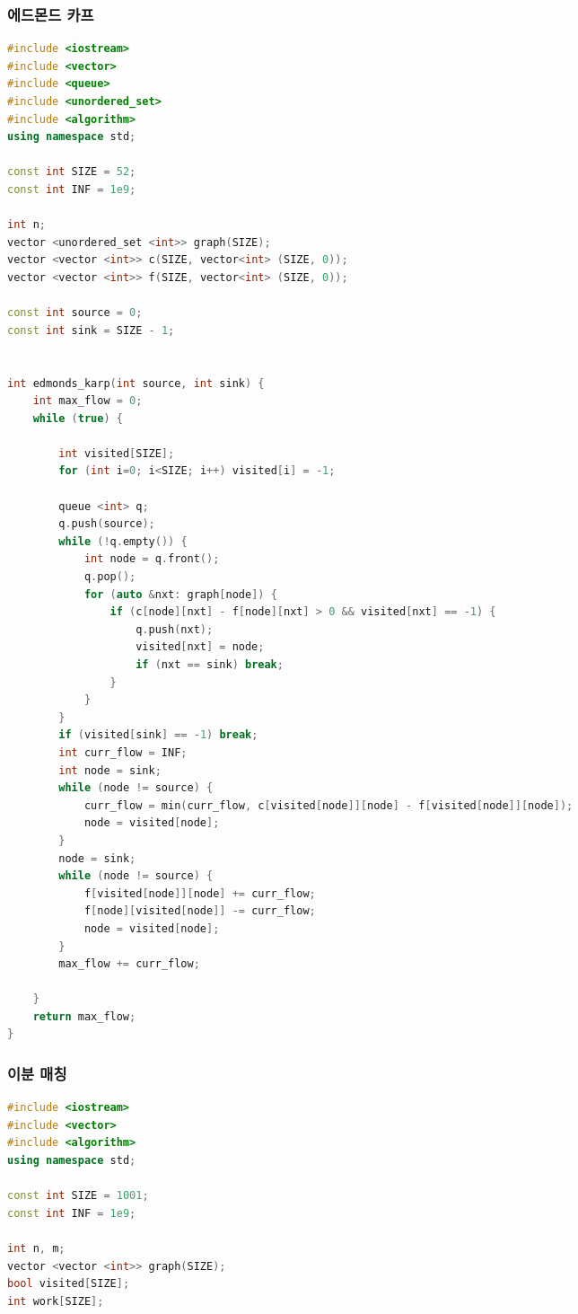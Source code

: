 \documentclass[]{article}
\begin{document}
\begin{multicols*}{2}
\subsubsection{에드몬드 카프}
\begin{lstlisting}[language=c++]
#include <iostream>
#include <vector>
#include <queue>
#include <unordered_set>
#include <algorithm>
using namespace std;

const int SIZE = 52;
const int INF = 1e9;

int n;
vector <unordered_set <int>> graph(SIZE);
vector <vector <int>> c(SIZE, vector<int> (SIZE, 0));
vector <vector <int>> f(SIZE, vector<int> (SIZE, 0));

const int source = 0;
const int sink = SIZE - 1;


int edmonds_karp(int source, int sink) {
    int max_flow = 0;
    while (true) {

        int visited[SIZE];
        for (int i=0; i<SIZE; i++) visited[i] = -1;

        queue <int> q;
        q.push(source);
        while (!q.empty()) {
            int node = q.front();
            q.pop();
            for (auto &nxt: graph[node]) {
                if (c[node][nxt] - f[node][nxt] > 0 && visited[nxt] == -1) {
                    q.push(nxt);
                    visited[nxt] = node;
                    if (nxt == sink) break;
                }
            }
        }
        if (visited[sink] == -1) break;
        int curr_flow = INF;
        int node = sink;
        while (node != source) {
            curr_flow = min(curr_flow, c[visited[node]][node] - f[visited[node]][node]);
            node = visited[node];
        }
        node = sink;
        while (node != source) {
            f[visited[node]][node] += curr_flow;
            f[node][visited[node]] -= curr_flow;
            node = visited[node];
        }
        max_flow += curr_flow;

    }
    return max_flow;
}
\end{lstlisting}
\subsubsection{이분 매칭}
\begin{lstlisting}[language=c++]
#include <iostream>
#include <vector>
#include <algorithm>
using namespace std;

const int SIZE = 1001;
const int INF = 1e9;

int n, m;
vector <vector <int>> graph(SIZE);
bool visited[SIZE];
int work[SIZE];


\end{lstlisting}
\end{multicols*}
\end{document}
